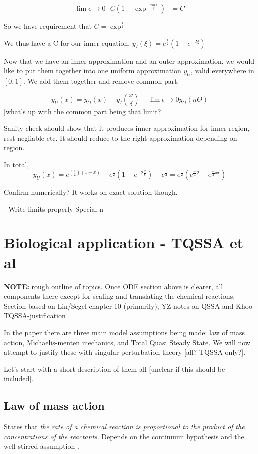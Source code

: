 \documentclass[12pt]{report}
\begin{document}
$$\lim \epsilon \to 0[C(1-\exp^{-\frac{2n \Theta}{\delta}})] = C$$

So we have requirement that $C = \exp^{\frac 1 2}$

We thus have a C for our inner equation,
$y_I(\xi) = e^{\frac 1 2}(1-e^{-2\xi})$

Now that we have an inner approximation and an outer approximation, we
would like to put them together into one uniform approximation $y_U$,
valid everywhere in $[0,1]$. We add them together and remove common part.

$$y_U(x) = y_O(x) + y_I(\frac x \delta) - \lim \epsilon \to 0 y_O(n \Theta)$$
[what's up with the common part being that limit?

Sanity check should show that it produces inner approximation for
inner region, rest negliable etc. It should reduce to the right
approximation depending on region.

In total, $$y_U(x) = e^{(\frac 1 2)(1-x)} + e^{\frac 1 2}(1 -
		e^{-2\frac x \epsilon}) - e^{\frac 1 2} = e^{\frac 1 2}(e^{\frac -x 2}
			- e^{\frac -2x \epsilon})$$

Confirm numerically? It works on exact solution though.


- Write limits properly Special n

\chapter{Biological application - TQSSA et al}

\textbf{NOTE:} rough outline of topics. Once ODE section above is
clearer, all components there except for scaling and translating the
chemical reactions.  Section based on Lin/Segel chapter 10
(primarily), YZ-notes on QSSA and Khoo TQSSA-justification

In the paper there are three main model assumptions being made: law of
mass action, Michaelis-menten mechanics, and Total Quasi Steady
State. We will now attempt to justify these with singular perturbation
theory [all? TQSSA only?].

Let's start with a short description of them all [unclear if this should be included].

\section{Law of mass action}

States that \textit{the rate of a chemical reaction is proportional to the
product of the concentrations of the reactants}. Depends on the continuum
hypothesis and the well-stirred assumption \cite{Ingalls}.
\end{document}
